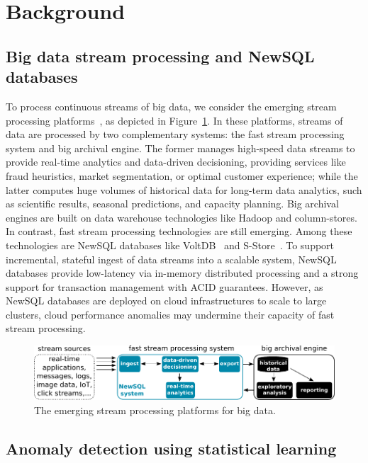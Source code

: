 \section{Background}
\label{sec:background}


\subsection{Big data stream processing and NewSQL databases}

To process continuous streams of big data, we consider the emerging stream processing platforms~\cite{leskovec2014mining}, as depicted in Figure~\ref{fig:newsql_data_stream}. In these platforms, streams of data are processed by two complementary systems: the fast stream processing system and big archival engine. The former manages high-speed data streams to provide real-time analytics and data-driven decisioning, providing services like fraud heuristics, market segmentation, or optimal customer experience; while the latter computes huge volumes of historical data for long-term data analytics, such as scientific results, seasonal predictions, and capacity planning. Big archival engines are built on data warehouse technologies like Hadoop and column-stores. In contrast, fast stream processing technologies are still emerging. Among these technologies are NewSQL databases like VoltDB~\cite{stonebraker2013voltdb} and S-Store~\cite{cetintemel2014s}. To support incremental, stateful ingest of data streams into a scalable system, NewSQL databases provide low-latency via in-memory distributed processing and a strong support for transaction management with ACID guarantees. However, as NewSQL databases are deployed on cloud infrastructures to scale to large clusters, cloud performance anomalies may undermine their capacity of fast stream processing.

\begin{figure}[!h]
  \centering
     \includegraphics[width=.8\textwidth]{inputs/img/simple_newsql_data_stream}
  \caption{The emerging stream processing platforms for big data.}
  \label{fig:newsql_data_stream}
\end{figure}

\subsection{Anomaly detection using statistical learning}
\label{subsec:anomaly}

